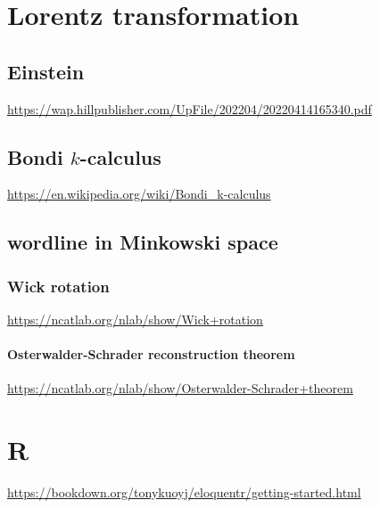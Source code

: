 \documentclass[
]{book}
\theoremstyle{definition}
\theoremstyle{definition}
\theoremstyle{definition}
\theoremstyle{definition}
\theoremstyle{remark}
\begin{document}
\hypertarget{lorentz-transformation}{%
\chapter{Lorentz transformation}\label{lorentz-transformation}}

\hypertarget{einstein}{%
\section{Einstein}\label{einstein}}

\url{https://wap.hillpublisher.com/UpFile/202204/20220414165340.pdf}

\hypertarget{bondi-k-calculus}{%
\section{\texorpdfstring{Bondi \(k\)-calculus}{Bondi k-calculus}}\label{bondi-k-calculus}}

\url{https://en.wikipedia.org/wiki/Bondi_k-calculus}

\hypertarget{wordline-in-minkowski-space}{%
\section{wordline in Minkowski space}\label{wordline-in-minkowski-space}}

\hypertarget{wick-rotation}{%
\subsection{Wick rotation}\label{wick-rotation}}

\url{https://ncatlab.org/nlab/show/Wick+rotation}

\hypertarget{osterwalder-schrader-reconstruction-theorem}{%
\subsubsection{Osterwalder-Schrader reconstruction theorem}\label{osterwalder-schrader-reconstruction-theorem}}

\url{https://ncatlab.org/nlab/show/Osterwalder-Schrader+theorem}

\hypertarget{r}{%
\chapter{R}\label{r}}

\url{https://bookdown.org/tonykuoyj/eloquentr/getting-started.html}
\end{document}
